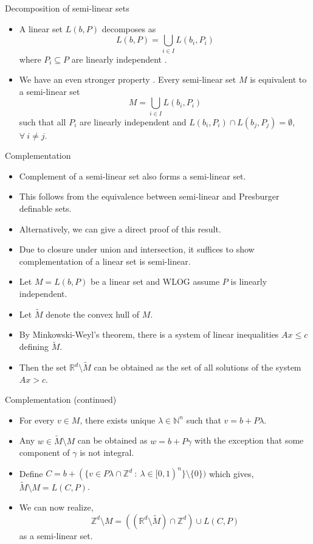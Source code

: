 \documentclass[10pt]{beamer}
\begin{document}
\begin{frame}{Decomposition of semi-linear sets}
    \begin{itemize}
        \item A linear set $L(b,P)$ decomposes as 
        \[ L(b,P)=\bigcup_{i\in I}L(b_i,P_i)\] 
        where $P_i\subseteq P$ are linearly independent \cite{ginsburg1963bounded}.
        \item We have an even stronger property \cite{ito1969every}. Every semi-linear set $M$ is equivalent
        to a semi-linear set 
        \[M= \bigcup _{i\in I} L(b_i,P_i)\]
        such that all $P_i$ are linearly independent and $L(b_i,P_i)\cap L(b_j,P_j)=\emptyset$, $\forall\:i\neq j$.
    \end{itemize}
\end{frame}
\begin{frame}{Complementation}
    \begin{itemize}
        \item Complement of a semi-linear set also forms a semi-linear set.
        \item This follows from the equivalence between semi-linear and Presburger definable sets.
        \item Alternatively, we can give a direct proof of this result. 
        \item Due to closure under union and intersection, it suffices to show complementation
        of a linear set is semi-linear.
        \item Let $M=L(b,P)$ be a linear set and WLOG assume $P$ is linearly independent.
        \item Let $\widetilde{M}$ denote the convex hull of $M$. 
        \item By Minkowski-Weyl's theorem, there is a system of linear inequalities $Ax\leq c$ defining $\widetilde{M}$.
        \item Then the set $\mathbb{R}^d\setminus \widetilde{M}$ can be obtained as the set of all solutions of the system 
        $Ax>c$.
    \end{itemize}
\end{frame}
\begin{frame}{Complementation (continued)}
    \begin{itemize}
        \item For every $v\in M$, there exists unique $\lambda\in \mathbb{N}^n$ such that
        $v=b+P\lambda$. 
        \item Any $w\in \widetilde{M}\setminus M$ can be obtained as $w=b+P\gamma$
        with the exception that some component of $\gamma$ is not integral.
        \item Define $C=b+(\{v\in P\lambda\cap \mathbb{Z}^d\::\:\lambda \in [0,1)^n\}\setminus \{0\})$
        which gives, $\widetilde{M}\setminus M= L(C,P)$.
        \item We can now realize, 
        \[\mathbb{Z}^d\setminus M=((\mathbb{R}^d\setminus \widetilde{M})\cap \mathbb{Z}^d)\cup L(C,P)\] 
        as a semi-linear set.
    \end{itemize}
\end{frame}
\end{document}
